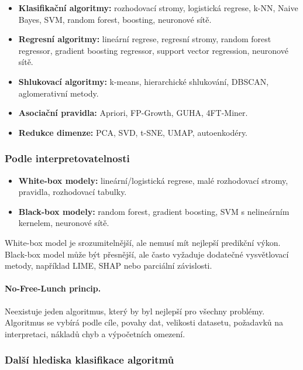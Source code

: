 \begin{itemize}
    \item \textbf{Klasifikační algoritmy:}
    rozhodovací stromy, logistická regrese, k-NN, Naive Bayes, SVM, random forest, boosting,
    neuronové sítě.
    
    \item \textbf{Regresní algoritmy:}
    lineární regrese, regresní stromy, random forest regressor, gradient boosting regressor,
    support vector regression, neuronové sítě.
    
    \item \textbf{Shlukovací algoritmy:}
    k-means, hierarchické shlukování, DBSCAN, aglomerativní metody.
    
    \item \textbf{Asociační pravidla:}
    Apriori, FP-Growth, GUHA, 4FT-Miner.
    
    \item \textbf{Redukce dimenze:}
    PCA, SVD, t-SNE, UMAP, autoenkodéry.
\end{itemize}

\subsubsection{Podle interpretovatelnosti}

\begin{itemize}
    \item \textbf{White-box modely:}
    lineární/logistická regrese, malé rozhodovací stromy, pravidla, rozhodovací tabulky.
    
    \item \textbf{Black-box modely:}
    random forest, gradient boosting, SVM s nelineárním kernelem, neuronové sítě.
\end{itemize}

White-box model je srozumitelnější, ale nemusí mít nejlepší predikční výkon. Black-box model může být přesnější,
ale často vyžaduje dodatečné vysvětlovací metody, například LIME, SHAP nebo parciální závislosti.

\paragraph{No-Free-Lunch princip.}
Neexistuje jeden algoritmus, který by byl nejlepší pro všechny problémy. Algoritmus se vybírá podle cíle,
povahy dat, velikosti datasetu, požadavků na interpretaci, nákladů chyb a výpočetních omezení.

\subsubsection{Další hlediska klasifikace algoritmů}

